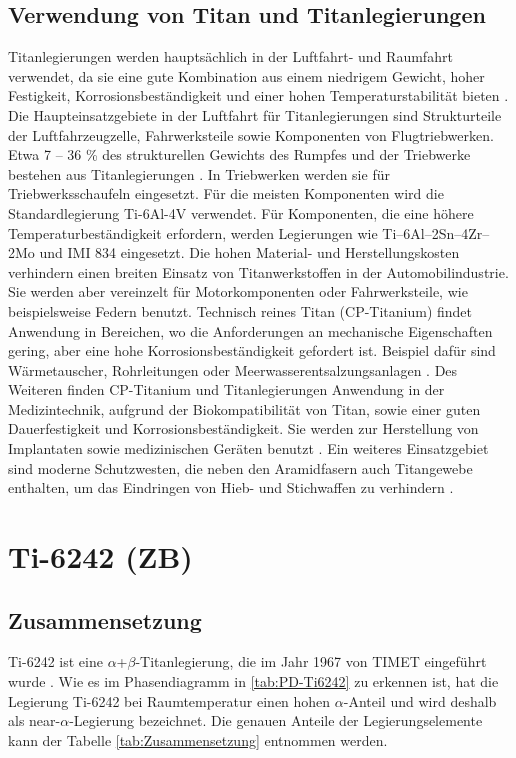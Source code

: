 \pagebreak

\subsection{Verwendung von Titan und Titanlegierungen}
Titanlegierungen werden hauptsächlich in der Luftfahrt- und Raumfahrt verwendet, da sie eine gute Kombination aus einem niedrigem Gewicht, hoher Festigkeit, Korrosionsbeständigkeit und einer hohen Temperaturstabilität bieten \cite{C.Leyens.2005,R.R.Boyer.1996,M.PetersJ.KumpfertC.WardC.Leyens.2003}. Die Haupteinsatzgebiete in der Luftfahrt für Titanlegierungen sind Strukturteile der Luftfahrzeugzelle, Fahrwerksteile sowie Komponenten von Flugtriebwerken. Etwa 7 -- 36 \% des strukturellen Gewichts des Rumpfes und der Triebwerke bestehen aus Titanlegierungen \cite{Lutjering.2007}. In Triebwerken werden sie für Triebwerksschaufeln eingesetzt. Für die meisten Komponenten wird die Standardlegierung Ti-6Al-4V verwendet. Für Komponenten, die eine höhere Temperaturbeständigkeit erfordern, werden Legierungen wie Ti–6Al–2Sn–4Zr–2Mo und IMI 834 eingesetzt. Die hohen Material- und Herstellungskosten verhindern einen breiten Einsatz von Titanwerkstoffen in der Automobilindustrie. Sie werden aber vereinzelt für Motorkomponenten oder Fahrwerksteile, wie beispielsweise Federn benutzt. Technisch reines Titan (CP-Titanium) findet Anwendung in Bereichen, wo die Anforderungen an mechanische Eigenschaften gering, aber eine hohe Korrosionsbeständigkeit gefordert ist. Beispiel dafür sind Wärmetauscher, Rohrleitungen oder Meerwasserentsalzungsanlagen \cite{A.D.KhawajiaI.K.KutubkhanahaJ.M.Wieb.2008}. Des Weiteren finden CP-Titanium und Titanlegierungen Anwendung in der Medizintechnik, aufgrund der Biokompatibilität von Titan, sowie einer guten Dauerfestigkeit und Korrosionsbeständigkeit. Sie werden zur Herstellung von Implantaten sowie medizinischen Geräten benutzt \cite{M.GeethaA.K.SinghR.AsokamaniA.K.Gogia.2009}. Ein weiteres Einsatzgebiet sind moderne Schutzwesten, die neben den Aramidfasern auch Titangewebe enthalten, um das Eindringen von Hieb- und Stichwaffen zu verhindern \cite{C.Leyens.2005}.  



\section{Ti-6242 (ZB)}

\subsection{Zusammensetzung}
Ti-6242 ist eine $\alpha$+$\beta$-Titanlegierung, die im Jahr 1967 von TIMET eingeführt wurde \cite{ImmanuelFreiherrvonThungen.}. 
Wie es im Phasendiagramm in \ref{tab:PD-Ti6242} zu erkennen ist, hat die Legierung Ti-6242 bei Raumtemperatur einen hohen $\alpha$-Anteil und wird deshalb als near-$\alpha$-Legierung bezeichnet.
Die genauen Anteile der Legierungselemente kann der Tabelle \ref{tab:Zusammensetzung} entnommen werden. 


